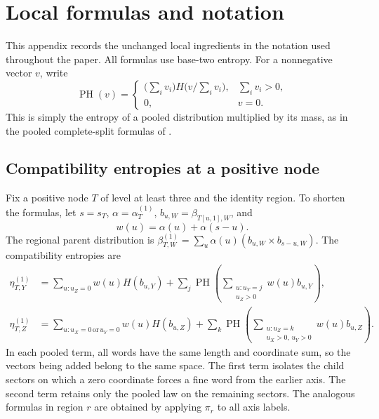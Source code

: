 \documentclass[11pt,a4paper]{article}
\DeclareMathOperator{\PH}{PH}
\begin{document}
\clearpage



\clearpage
\appendix
{}
\section{Local formulas and notation}\label{app:local}

This appendix records the unchanged local ingredients in the notation used throughout the paper. All formulas use base-two entropy. For a nonnegative vector $v$, write
\begin{equation}\label{eq:perspective-entropy}
\PH(v)=\begin{cases}
\bigl(\sum_i v_i\bigr)H\bigl(v/\sum_i v_i\bigr),&\sum_i v_i>0,\\
0,&v=0.
\end{cases}
\end{equation}
This is simply the entropy of a pooled distribution multiplied by its mass, as in the pooled complete-split formulas of \citet{dupont2026}.

\subsection{Compatibility entropies at a positive node}

Fix a positive node $T$ of level at least three and the identity region. To shorten the formulas, let $s=s_T$, $\alpha=\alpha_T^{(1)}$, $b_{u,W}=\beta_{T[u,1],W}$, and
\[
w(u)=\alpha(u)+\alpha(s-u).
\]
The regional parent distribution is
$\beta_{T,W}^{(1)}=\sum_u\alpha(u)(b_{u,W}\times b_{s-u,W})$.
The compatibility entropies are
\begin{align}
\eta_{T,Y}^{(1)}
&=\sum_{u:u_Z=0}w(u)H(b_{u,Y})
 +\sum_j\PH\!\left(\sum_{\substack{u:u_Y=j\\u_Z>0}}w(u)b_{u,Y}\right),\label{eq:eta-Y}\\
\eta_{T,Z}^{(1)}
&=\sum_{u:u_X=0\,\text{or}\,u_Y=0}w(u)H(b_{u,Z})
 +\sum_k\PH\!\left(\sum_{\substack{u:u_Z=k\\u_X>0,\,u_Y>0}}w(u)b_{u,Z}\right).
\label{eq:eta-Z}
\end{align}
In each pooled term, all words have the same length and coordinate sum, so the vectors being added belong to the same space. The first term isolates the child sectors on which a zero coordinate forces a fine word from the earlier axis. The second term retains only the pooled law on the remaining sectors. The analogous formulas in region $r$ are obtained by applying $\pi_r$ to all axis labels.
\end{document}
